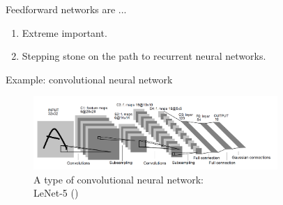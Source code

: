 \documentclass[10pt]{beamer}
\begin{document}
	\begin{frame}{Feedforward networks are ...}
		\onslide<1->
		\begin{enumerate}
			\item Extreme important.
			\item Stepping stone on the path to recurrent neural networks.
		\end{enumerate}
		
		\begin{exampleblock}{Example: convolutional neural network}
			\begin{figure}
				\includegraphics<2->[width=25em]{figures/lenet-5.png}
				\caption{A type of convolutional neural network: \\ LeNet-5 (\citet{lecun1998gradient})}
			\end{figure}
		\end{exampleblock}
	\end{frame}
\end{document}
